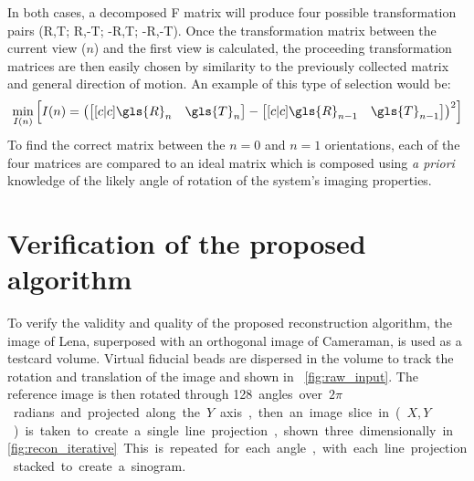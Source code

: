 \documentclass{osa-article}
\begin{document}
In both cases, a decomposed \gls{F} matrix will produce four possible transformation pairs (\gls{R},\gls{T}; \gls{R},-\gls{T}; -\gls{R},\gls{T}; -\gls{R},-\gls{T}).
Once the transformation matrix between the current view (\(n\)) and the first view is calculated, the proceeding transformation matrices are then easily chosen by similarity to the previously collected matrix and general direction of motion.
An example of this type of selection would be:
\begin{align}
\min_{I(n)}\left[I(n) = \left(\begin{bmatrix}[c|c] \gls{R}_n&\gls{T}_n \end{bmatrix} - \begin{bmatrix}[c|c] \gls{R}_{n-1}&\gls{T}_{n-1} \end{bmatrix}\right)^2\right]
\end{align}
To find the correct matrix between the \(n=0\) and \(n=1\) orientations, each of the four matrices are compared to an ideal matrix which is composed using \emph{a priori} knowledge of the likely angle of rotation of the system's imaging properties.

\section{Verification of the proposed algorithm}

To verify the validity and quality of the proposed reconstruction algorithm, the image of Lena, superposed with an orthogonal image of Cameraman, is used as a testcard volume.
Virtual fiducial beads are dispersed in the volume to track the rotation and translation of the image and shown in \figurename~\ref{fig:raw_input}.
The reference image is then rotated through \SI{128} angles over \(2\pi \) radians and projected along the \(Y\) axis, then an image slice in (\(X,Y\)) is taken to create a single line projection, shown three dimensionally in \figurename~\ref{fig:recon_iterative}.
This is repeated for each angle,  with each line projection stacked to create a sinogram.%

\end{document}
